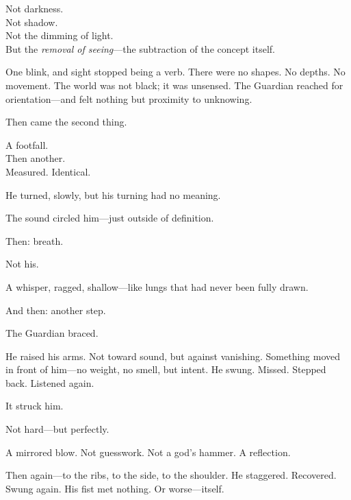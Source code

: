 \documentclass[12pt]{article}
\begin{document}
\vspace{0.5em}
Not darkness.\\
Not shadow.\\
Not the dimming of light.\\
But the \textit{removal of seeing}---the subtraction of the concept itself.

\vspace{0.5em}
One blink, and sight stopped being a verb. There were no shapes. No depths. No movement. The world was not black; it was unsensed. The Guardian reached for orientation---and felt nothing but proximity to unknowing.

\vspace{0.5em}
Then came the second thing.

\vspace{0.5em}
A footfall.\\
Then another.\\
Measured. Identical.

\vspace{0.5em}
He turned, slowly, but his turning had no meaning.

\vspace{0.5em}
The sound circled him---just outside of definition.

\vspace{0.5em}
Then: breath.

\vspace{0.5em}
Not his.

\vspace{0.5em}
A whisper, ragged, shallow---like lungs that had never been fully drawn.

\vspace{0.5em}
And then: another step.

\vspace{0.5em}
The Guardian braced.

\vspace{0.5em}
He raised his arms. Not toward sound, but against vanishing. Something moved in front of him---no weight, no smell, but intent. He swung. Missed. Stepped back. Listened again.

\vspace{0.5em}
It struck him.

\vspace{0.5em}
Not hard---but perfectly.

\vspace{0.5em}
A mirrored blow. Not guesswork. Not a god’s hammer. A reflection.

\vspace{0.5em}
Then again---to the ribs, to the side, to the shoulder. He staggered. Recovered. Swung again. His fist met nothing. Or worse---itself.
\end{document}
